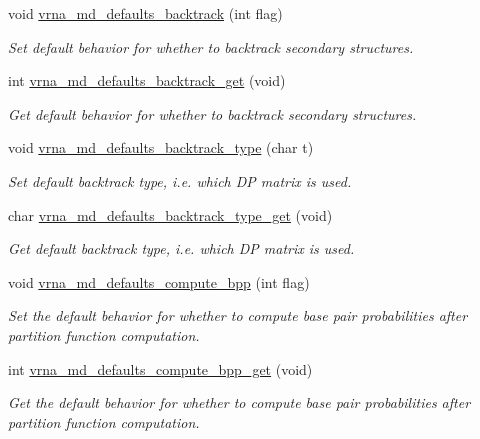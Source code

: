 \begin{DoxyCompactItemize}
void \hyperlink{group__model__details_ga978c468b2fe96a70d5191e3dd17d5599}{vrna\+\_\+md\+\_\+defaults\+\_\+backtrack} (int flag)
\begin{DoxyCompactList}\small\item\em Set default behavior for whether to backtrack secondary structures. \end{DoxyCompactList}\item 
int \hyperlink{group__model__details_ga90da1156e6883ddd68527c2830706648}{vrna\+\_\+md\+\_\+defaults\+\_\+backtrack\+\_\+get} (void)
\begin{DoxyCompactList}\small\item\em Get default behavior for whether to backtrack secondary structures. \end{DoxyCompactList}\item 
void \hyperlink{group__model__details_ga68305274de96b56b7799575e222560d8}{vrna\+\_\+md\+\_\+defaults\+\_\+backtrack\+\_\+type} (char t)
\begin{DoxyCompactList}\small\item\em Set default backtrack type, i.\+e. which DP matrix is used. \end{DoxyCompactList}\item 
char \hyperlink{group__model__details_ga1425b4ebd0e034dead66d79becd64143}{vrna\+\_\+md\+\_\+defaults\+\_\+backtrack\+\_\+type\+\_\+get} (void)
\begin{DoxyCompactList}\small\item\em Get default backtrack type, i.\+e. which DP matrix is used. \end{DoxyCompactList}\item 
void \hyperlink{group__model__details_gaf1b5db10f1f476767f9a95f8a78e3132}{vrna\+\_\+md\+\_\+defaults\+\_\+compute\+\_\+bpp} (int flag)
\begin{DoxyCompactList}\small\item\em Set the default behavior for whether to compute base pair probabilities after partition function computation. \end{DoxyCompactList}\item 
int \hyperlink{group__model__details_gaa3a537e61fbe0518673bf9f73fd820f3}{vrna\+\_\+md\+\_\+defaults\+\_\+compute\+\_\+bpp\+\_\+get} (void)
\begin{DoxyCompactList}\small\item\em Get the default behavior for whether to compute base pair probabilities after partition function computation. \end{DoxyCompactList}\item 

\end{DoxyCompactItemize}
